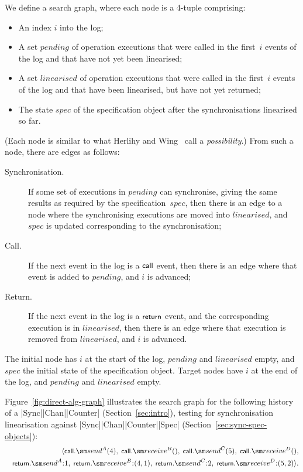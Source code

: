 We define a search graph, where each node is a 4-tuple
comprising:
%
\begin{itemize}
\item An index $i$ into the log;

\item A set $pending$ of operation executions that were called in the
  first~$i$ events of the log and that have not yet been linearised;

\item A set $linearised$ of operation executions that were called in the
  first~$i$ events of the log and that have been linearised, but have not yet
  returned;

\item The state $spec$ of the specification object after the synchronisations
  linearised so far.
\end{itemize}
%
(Each node is similar to what Herlihy and Wing~\cite{herlihy-wing} call a
\emph{possibility}.) 
From such a node, there are edges as follows:
%
\def\edgeFont#1{\rm\textsf{#1}}
\begin{description}
\item[\edgeFont{Synchronisation}.] If some set of executions in $pending$ can
  synchronise, giving the same results as required by the
  specification~$spec$, then there is an edge to a node where the
  synchronising executions are moved into $linearised$, and $spec$ is updated
  corresponding to the synchronisation;

\item[\edgeFont{Call}.] If the next event in the log is a $\mbox{\sf{\small call}}$ event, then
  there is an edge where that event is added to $pending$, and $i$ is
  advanced;

\item[\edgeFont{Return}.] If the next event in the log is a $\mbox{\sf{\small return}}$ event,
  and the corresponding execution is in $linearised$, then there is an edge
  where that execution is removed from $linearised$, and $i$ is advanced.
\end{description}
%
The initial node has $i$ at the start of the log, $pending$ and
$linearised$ empty, and $spec$ the initial state of the specification object.
Target nodes have $i$ at the end of the log, and $pending$ and
$linearised$ empty.

Figure~\ref{fig:direct-alg-graph} illustrates the search graph for the
following history of a |Sync|\-|Chan|\-|Counter| (Section~\ref{sec:intro}),
testing for synchronisation linearisation against
|Sync|\-|Chan|\-|Counter|\-|Spec| (Section~\ref{sec:sync-spec-objects}):
\[
\begin{align}
\seq{ 
 \call.\send^A(4),\; \call.\receive^B(),\; \call.\send^C(5),\; 
 \call.\receive^D(),
 \\
\quad
 \return.\send^A\::1,\; \return.\receive^B\::(4,1),\; \return.\send^C\::2,\;
 \return.\receive^D\:: (5,2) }.
\end{align}
\]

